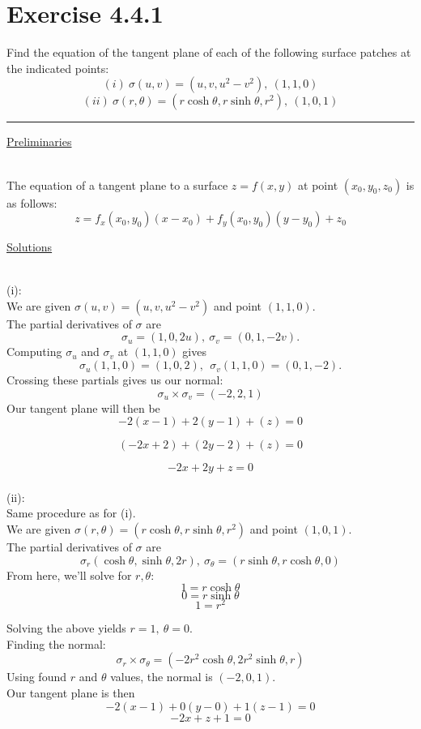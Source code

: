 \documentclass[12pt]{article}
\newcommand{\ulind}[1]
{
\noindent
\underline{#1}\\\\
\indent
}
\begin{document}
\maketitle

\section*{Exercise 4.4.1}
\indent

Find the equation of the tangent plane of each of the following surface patches at the indicated points:\\

$$
(i) \ \sigma(u,v) = (u,v,u^2-v^2), \ (1,1,0)
$$
$$
(ii) \ \sigma(r,\theta) = (r \cosh \theta, r \sinh \theta,r^2), \ (1,0,1)
$$

\vspace{1cm}
\hrule
\vspace{1cm}
\noindent

\ulind{Preliminaries}

The equation of a tangent plane to a surface $z = f(x,y)$ at point $(x_0,y_0,z_0)$ is as follows:
$$
z = f_x(x_0,y_0)(x-x_0)+f_y(x_0,y_0)(y-y_0)+z_0
$$

\ulind{Solutions}
(i):\\
We are given $\sigma(u,v) = (u,v,u^2-v^2)$ and point $(1,1,0)$.\\
The partial derivatives of $\sigma$ are
$$
\sigma_u = (1,0,2u), \ \sigma_v = (0,1,-2v). 
$$
Computing $\sigma_u$ and $\sigma_v$ at $(1,1,0)$ gives
$$
\sigma_u(1,1,0) = (1,0,2), \ \ \sigma_v(1,1,0) = (0,1,-2). 
$$
Crossing these partials gives us our normal:
$$
\sigma_u \times \sigma_v = (-2,2,1)
$$
Our tangent plane will then be
$$
-2(x-1)+2(y-1)+(z)=0
$$

$$
(-2x+2)+(2y-2)+(z)=0
$$

$$
-2x+2y+z=0
$$
\\
(ii):\\
Same procedure as for (i).\\
We are given $\sigma(r,\theta) = (r \cosh \theta, r \sinh \theta,r^2)$ and point $(1,0,1)$.\\
The partial derivatives of $\sigma$ are
$$
\sigma_r(\cosh\theta, \sinh \theta,2r), \ \sigma_\theta = (r\sinh\theta,r\cosh\theta,0)
$$
From here, we'll solve for $r, \theta$:
$$1 = r\cosh\theta$$
$$0 = r\sinh\theta$$
$$1 = r^2$$

Solving the above yields $r = 1, \ \theta = 0$.\\


Finding the normal:
$$
\sigma_r \times \sigma_\theta = (-2r^2\cosh\theta,2r^2\sinh\theta,r)
$$
Using found $r$ and $\theta$ values, the normal is $(-2,0,1)$.\\
Our tangent plane is then
$$
-2(x-1)+0(y-0)+1(z-1) = 0
$$
$$
-2x+z+1 = 0
$$
\end{document}
